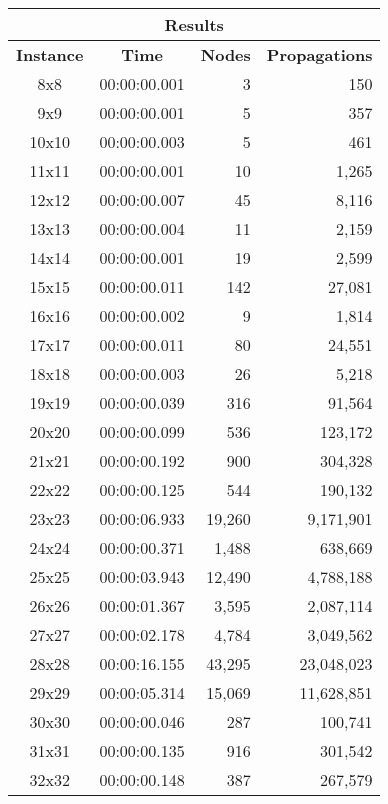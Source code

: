 
\begin{center}
    \begin{tabular}{|c|c|r|r|}
        \hline
        \multicolumn{4}{|c|}{\textbf{Results}} \\
        \hline
        \textbf{Instance} & \textbf{Time} & \textbf{Nodes} & \textbf{Propagations} \\
        
        \hline
		8x8 & 00:00:00.001 & 3 & 150 \\ \hline
		9x9 & 00:00:00.001 & 5 & 357 \\ \hline
		10x10 & 00:00:00.003 & 5 & 461 \\ \hline
		11x11 & 00:00:00.001 & 10 & 1,265 \\ \hline
		12x12 & 00:00:00.007 & 45 & 8,116 \\ \hline
		13x13 & 00:00:00.004 & 11 & 2,159 \\ \hline
		14x14 & 00:00:00.001 & 19 & 2,599 \\ \hline
		15x15 & 00:00:00.011 & 142 & 27,081 \\ \hline
		16x16 & 00:00:00.002 & 9 & 1,814 \\ \hline
		17x17 & 00:00:00.011 & 80 & 24,551 \\ \hline
		18x18 & 00:00:00.003 & 26 & 5,218 \\ \hline
		19x19 & 00:00:00.039 & 316 & 91,564 \\ \hline
		20x20 & 00:00:00.099 & 536 & 123,172 \\ \hline
		21x21 & 00:00:00.192 & 900 & 304,328 \\ \hline
		22x22 & 00:00:00.125 & 544 & 190,132 \\ \hline
		23x23 & 00:00:06.933 & 19,260 & 9,171,901 \\ \hline
		24x24 & 00:00:00.371 & 1,488 & 638,669 \\ \hline
		25x25 & 00:00:03.943 & 12,490 & 4,788,188 \\ \hline
		26x26 & 00:00:01.367 & 3,595 & 2,087,114 \\ \hline
		27x27 & 00:00:02.178 & 4,784 & 3,049,562 \\ \hline
		28x28 & 00:00:16.155 & 43,295 & 23,048,023 \\ \hline
		29x29 & 00:00:05.314 & 15,069 & 11,628,851 \\ \hline
		30x30 & 00:00:00.046 & 287 & 100,741 \\ \hline
		31x31 & 00:00:00.135 & 916 & 301,542 \\ \hline
		32x32 & 00:00:00.148 & 387 & 267,579 \\ \hline

\end{tabular}
\end{center}
